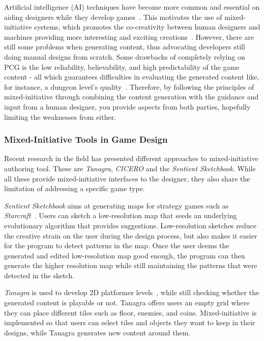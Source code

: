 Artificial intelligence (AI) techniques have become more common and essential on aiding designers while they develop games~. This motivates the use of mixed-initiative systems, which promotes the co-creativity between human designers and machines providing more interesting and exciting creations~. However, there are still some problems when generating content, thus advocating developers still doing manual designs from scratch. Some drawbacks of completely relying on PCG is the low reliability, believability, and high predictability of the game content - all which guarantees difficulties in evaluating the generated content like, for instance, a dungeon level's quality~. Therefore, by following the principles of mixed-initiative through combining the content generation with the guidance and input from a human designer, you provide aspects from both parties, hopefully limiting the weaknesses from either.  

\subsubsection{Mixed-Initiative Tools in Game Design}

Recent research in the field has presented different approaches to mixed-initiative authoring tool. These are \emph{Tanagra}, \emph{CICERO} and the \emph{Sentient Sketchbook}. While all these provide mixed-initiative interfaces to the designer, they also share the limitation of addressing a specific game type. 

\emph{Sentient Sketchbook} aims at generating maps for strategy games such as \emph{Starcraft}~. Users can sketch a low-resolution map that seeds an underlying evolutionary algorithm that provides suggestions. Low-resolution sketches reduce the creative strain on the user during the design process, but also makes it easier for the program to detect patterns in the map. Once the user deems the generated and edited low-resolution map good enough, the program can then generate the higher resolution map while still maintaining the patterns that were detected in the sketch. 

\emph{Tanagra} is used to develop 2D platformer levels~, while still checking whether the generated content is playable or not. Tanagra offers users an empty grid where they can place different tiles such as floor, enemies, and coins. Mixed-initiative is implemented so that users can select tiles and objects they want to keep in their designs, while Tanagra generates new content around them. 

